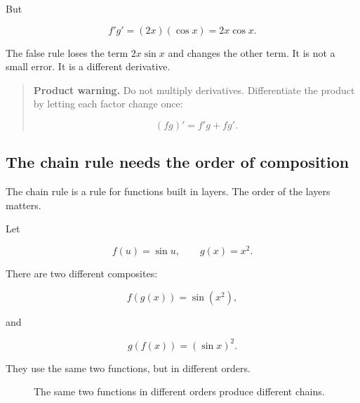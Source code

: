 But

\[
f'g'=(2x)(\cos x)=2x\cos x.
\]

The false rule loses the term \(2x\sin x\) and changes the other term.  It is not a small error.  It is a different derivative.

\begin{quote}
\textbf{Product warning.}
Do not multiply derivatives.  Differentiate the product by letting each factor change once:

\[
\boxed{
(fg)'=f'g+fg'.
}
\]
\end{quote}

\subsection{The chain rule needs the order of composition}
\label{subsec:chain-rule-composition-order-warning}

The chain rule is a rule for functions built in layers.  The order of the layers matters.

Let

\[
f(u)=\sin u,
\qquad
g(x)=x^2.
\]

There are two different composites:

\[
f(g(x))=\sin(x^2),
\]

and

\[
g(f(x))=(\sin x)^2.
\]

They use the same two functions, but in different orders.

\begin{figure}[h]
\centering
{}
\caption{The same two functions in different orders produce different chains.}
\label{fig:chain-rule-order-warning}
\end{figure}

